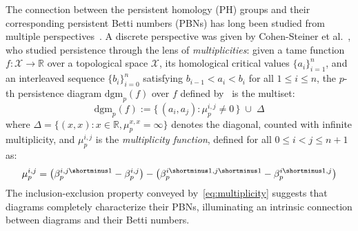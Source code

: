 
The connection between the persistent homology (PH) groups and their corresponding persistent Betti numbers (PBNs) has long been studied from multiple perspectives~\cite{cerri2013betti, chazal2016structure, cohen2005stability, zomorodian2004computing}.
A discrete perspective was given by Cohen-Steiner et al.~\cite{cohen2005stability}, who studied persistence through the lens of \emph{multiplicities}: given a tame function $f: \mathcal{X} \to \mathbb{R}$ over a topological space $\mathcal{X}$, its homological critical values $\{ a_i \}_{i=1}^n$, and an interleaved sequence $\{ b_i \}_{i=0}^n$ satisfying $b_{i-1} < a_i < b_i$ for all $1 \leq i \leq n$, the $p$-th persistence diagram $\mathrm{dgm}_p(f)$ over $f$ defined by~\cite{cohen2005stability}  is the multiset: 
\begin{equation}\label{eq:dgm}
\mathrm{dgm}_p(f) := \{ \, (a_i, a_j) :  \mu_p^{i,j} \neq 0 \, \} \; \cup \; \Delta	
\end{equation}
where $\Delta = \{(x,x): x \in \mathbb{R}, \mu_p^{x,x} = \infty \}$ denotes the diagonal, counted with infinite multiplicity, and $\mu_p^{i,j}$ is the  \emph{multiplicity function}, defined for all $0 \leq i < j \leq n+ 1$ as: 
\begin{equation}\label{eq:multiplicity}
	\mu_p^{i,j} = \left(\beta_p^{i,j\shortminus1} - \beta_p^{i,j} \right) - \left(\beta_p^{i\shortminus1,j\shortminus1} - \beta_p^{i\shortminus1,j} \right)
\end{equation}
The inclusion-exclusion property conveyed by~\eqref{eq:multiplicity} suggests that diagrams completely characterize their PBNs, illuminating an intrinsic connection between diagrams and their Betti numbers. 
